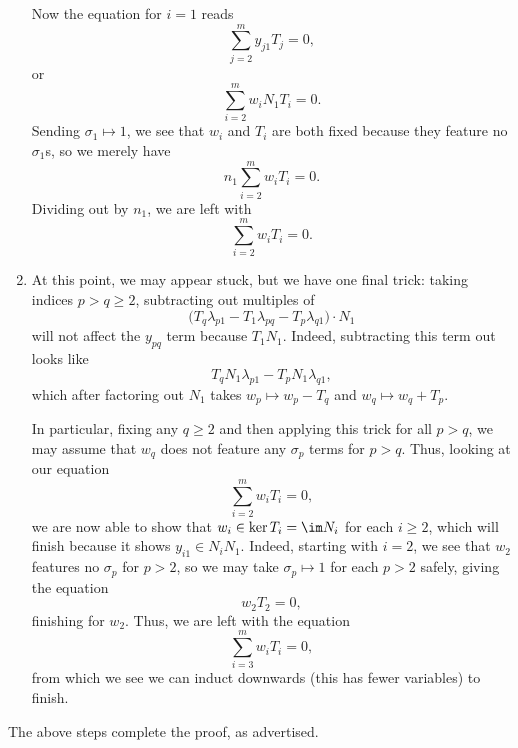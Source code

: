 \documentclass{article}
\numberwithin{equation}{section}
\begin{document}
\begin{enumerate}
	Now the equation for $i=1$ reads
	\[\sum_{j=2}^my_{j1}T_j=0,\]
	or
	\[\sum_{i=2}^mw_iN_1T_i=0.\]
	Sending $\sigma_1\mapsto1$, we see that $w_i$ and $T_i$ are both fixed because they feature no $\sigma_1$s, so we merely have
	\[n_1\sum_{i=2}^mw_iT_i=0.\]
	Dividing out by $n_1$, we are left with
	\[\sum_{i=2}^mw_iT_i=0.\]

	\item At this point, we may appear stuck, but we have one final trick: taking indices $p>q\ge2$, subtracting out multiples of
	\[\big(T_q\lambda_{p1}-T_1\lambda_{pq}-T_p\lambda_{q1}\big)\cdot N_1\]
	will not affect the $y_{pq}$ term because $T_1N_1$. Indeed, subtracting this term out looks like
	\[T_qN_1\lambda_{p1}-T_pN_1\lambda_{q1},\]
	which after factoring out $N_1$ takes $w_p\mapsto w_p-T_q$ and $w_q\mapsto w_q+T_p$.

	In particular, fixing any $q\ge2$ and then applying this trick for all $p>q$, we may assume that $w_q$ does not feature any $\sigma_p$ terms for $p>q$. Thus, looking at our equation
	\[\sum_{i=2}^mw_iT_i=0,\]
	we are now able to show that $w_i\in\ker T_i=\im N_i$ for each $i\ge2$, which will finish because it shows $y_{i1}\in N_iN_1$. Indeed, starting with $i=2$, we see that $w_2$ features no $\sigma_p$ for $p>2$, so we may take $\sigma_p\mapsto1$ for each $p>2$ safely, giving the equation
	\[w_2T_2=0,\]
	finishing for $w_2$. Thus, we are left with the equation
	\[\sum_{i=3}^mw_iT_i=0,\]
	from which we see we can induct downwards (this has fewer variables) to finish.
\end{enumerate}
The above steps complete the proof, as advertised.
\end{document}
